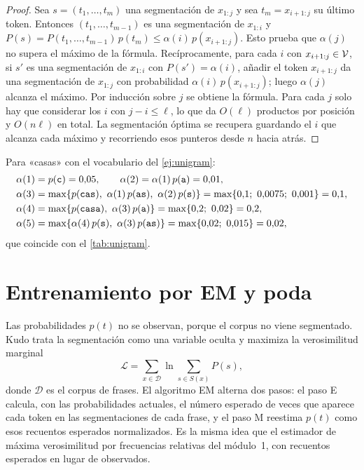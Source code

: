\begin{proof}
Sea $s=(t_1,\dots,t_m)$ una segmentación de $x_{1:j}$ y sea $t_m=x_{i+1:j}$ su último token. Entonces $(t_1,\dots,t_{m-1})$ es una segmentación de $x_{1:i}$ y $P(s)=P(t_1,\dots,t_{m-1})\,p(t_m)\le\alpha(i)\,p(x_{i+1:j})$. Esto prueba que $\alpha(j)$ no supera el máximo de la fórmula. Recíprocamente, para cada $i$ con $x_{i+1:j}\in\mathcal{V}$, si $s'$ es una segmentación de $x_{1:i}$ con $P(s')=\alpha(i)$, añadir el token $x_{i+1:j}$ da una segmentación de $x_{1:j}$ con probabilidad $\alpha(i)\,p(x_{i+1:j})$; luego $\alpha(j)$ alcanza el máximo. Por inducción sobre $j$ se obtiene la fórmula. Para cada $j$ solo hay que considerar los $i$ con $j-i\le\ell$, lo que da $O(\ell)$ productos por posición y $O(n\ell)$ en total. La segmentación óptima se recupera guardando el $i$ que alcanza cada máximo y recorriendo esos punteros desde $n$ hacia atrás.
\end{proof}

\begin{ejemplo}
Para «casas» con el vocabulario del \cref{ej:unigram}:
\[
\begin{aligned}
\alpha(1)&=p(\tok{c})=0{,}05, \qquad \alpha(2)=\alpha(1)\,p(\tok{a})=0{,}01,\\
\alpha(3)&=\max\{p(\tok{cas}),\ \alpha(1)\,p(\tok{as}),\ \alpha(2)\,p(\tok{s})\}=\max\{0{,}1;\ 0{,}0075;\ 0{,}001\}=0{,}1,\\
\alpha(4)&=\max\{p(\tok{casa}),\ \alpha(3)\,p(\tok{a})\}=\max\{0{,}2;\ 0{,}02\}=0{,}2,\\
\alpha(5)&=\max\{\alpha(4)\,p(\tok{s}),\ \alpha(3)\,p(\tok{as})\}=\max\{0{,}02;\ 0{,}015\}=0{,}02,
\end{aligned}
\]
que coincide con el \cref{tab:unigram}.
\end{ejemplo}

\section{Entrenamiento por EM y poda}

Las probabilidades $p(t)$ no se observan, porque el corpus no viene segmentado. Kudo trata la segmentación como una variable oculta y maximiza la verosimilitud marginal~\cite[§3.2]{kudo}
\[
\mathcal{L}=\sum_{x\in\mathcal{D}}\ln\sum_{s\in S(x)}P(s),
\]
donde $\mathcal{D}$ es el corpus de frases. El algoritmo EM alterna dos pasos: el paso E calcula, con las probabilidades actuales, el número esperado de veces que aparece cada token en las segmentaciones de cada frase, y el paso M reestima $p(t)$ como esos recuentos esperados normalizados. Es la misma idea que el estimador de máxima verosimilitud por frecuencias relativas del módulo~1, con recuentos esperados en lugar de observados.

